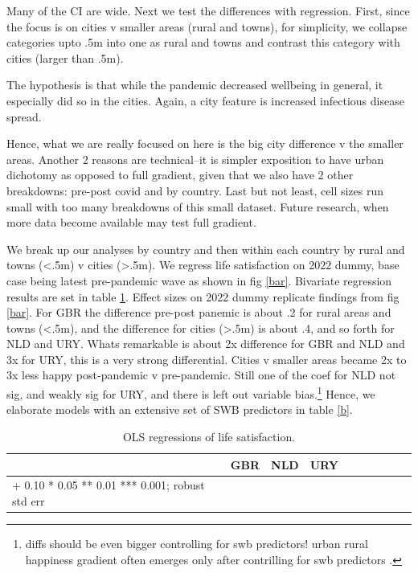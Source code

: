 \documentclass[10pt, letterpaper]{article}
\begin{document}
\begin{spacing}{1.4}
Many of the CI are wide. Next we test the differences with regression. First,
since the focus is on cities v smaller areas (rural and towns), for simplicity,
we collapse categories upto .5m into one as rural and towns and contrast this
category with cities (larger than .5m). 


The hypothesis is that while the pandemic decreased wellbeing in general, it
especially did so in the cities. Again, a city feature is increased
infectious disease spread.

Hence, what we are really focused on here is  the big city difference v the
smaller areas. Another 2 reasons are technical--it is simpler exposition to have
urban dichotomy as opposed to full gradient, given that we also have 2 other
breakdowns: pre-post covid and by country. Last but not least, cell sizes run
small with too many breakdowns of this small dataset. Future research, when more
data become available may test full gradient.  


We break up our analyses by country and then within each country by rural and
towns (<.5m) v cities (>.5m). We regress life satisfaction on 2022 dummy, base
case being latest pre-pandemic wave as shown in fig \ref{bar}. 
 Bivariate regression results are set in table \ref{a}.
 Effect sizes on 2022 dummy replicate findings from fig \ref{bar}. For GBR the
 difference pre-post panemic is about .2 for rural areas and towns (<.5m), and
 the difference for cities (>.5m) is about .4, and so forth for NLD and URY.
 Whats remarkable is about 2x difference for GBR and NLD and 3x for URY, this is
 a very strong differential. Cities v smaller areas became 2x to 3x less happy
 post-pandemic v pre-pandemic. 
 Still one of the coef for NLD not sig, and weakly
sig for URY, and there is left out variable bias.\footnote{diffs should be even
  bigger controlling for swb predictors! urban rural happiness gradient often
  emerges only after contrilling for swb predictors \citep{aok21}.} Hence,  we elaborate models with an
extensive set of SWB predictors in table \ref{b}.
 
 
\begin{spacing}{.9} \begin{table}[H]\centering   \begin{scriptsize} \begin{tabular}{p{1.8in}p{.5in}p{.5in}|p{.5in}p{.5in}|p{.5in}p{.5in}|p{.5in}p{.5in}p{.5in}p{.5 in}p{.5in}p{.5 in}}\hline&\multicolumn{2}{c}{GBR}&\multicolumn{2}{c}{NLD}&\multicolumn{2}{c}{URY}\\  \hline + 0.10 * 0.05 ** 0.01 *** 0.001; robust std err \end{tabular}\end{scriptsize}\caption{\label{a}OLS regressions of life satisfaction.}\end{table} \end{spacing}



\end{spacing}
\end{document}
